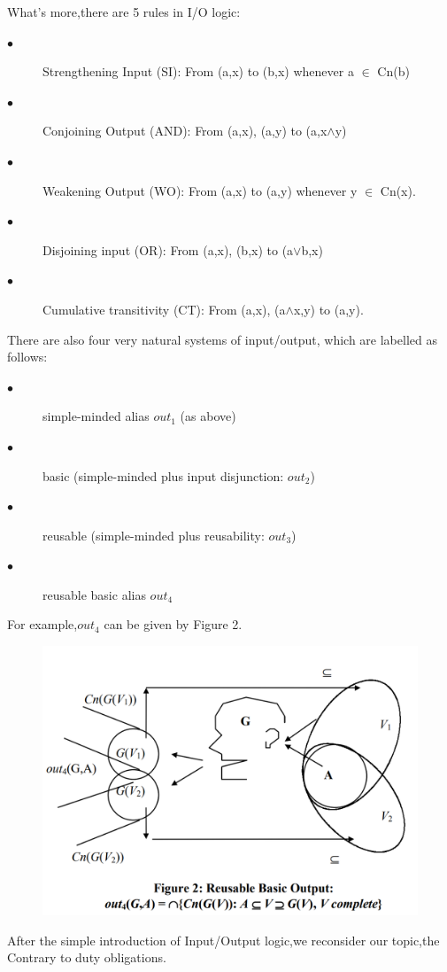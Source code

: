 \documentclass{article}
\begin{document}
What's more,there are 5  rules in I/O logic:
\begin{description}
\item[$\bullet$] Strengthening Input (SI): From (a,x) to (b,x) whenever a $\in$ Cn(b)
\item[$\bullet$] Conjoining Output (AND): From (a,x), (a,y) to (a,x$\wedge$y)
\item[$\bullet$] Weakening Output (WO): From (a,x) to (a,y) whenever y $\in$ Cn(x).
\item[$\bullet$] Disjoining input (OR): From (a,x), (b,x) to (a$\vee$b,x)
\item[$\bullet$] Cumulative transitivity (CT): From (a,x), (a$\wedge$x,y) to (a,y).
\end{description}
There are also four very natural systems of input/output, which are labelled as follows: 
\begin{description}
\item[$\bullet$]simple-minded alias $out_{1}$ (as above)
\item[$\bullet$]basic (simple-minded plus input disjunction: $out_{2}$)
\item[$\bullet$]reusable (simple-minded plus reusability: $out_{3}$)
\item[$\bullet$]reusable basic alias $out_{4}$
\end{description}
For example,$out_{4}$ can be given by Figure 2.\\
\newpage
\begin{figure}[hb]
\centering
\includegraphics[scale=0.4]{out4.png}

\label{fig_framework}
\end{figure}
After the simple introduction of Input/Output logic,we reconsider our topic,the Contrary to duty obligations.
\end{document}
